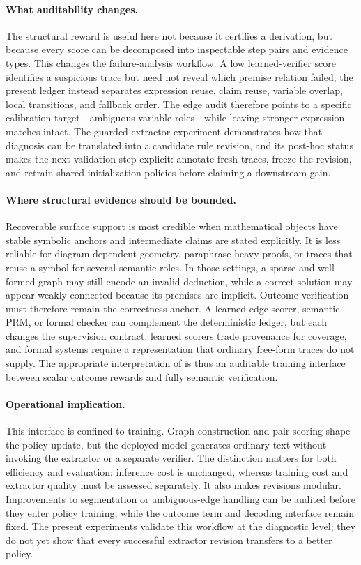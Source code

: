 \paragraph{What auditability changes.}
The structural reward is useful here not because it certifies a derivation, but because every score can be decomposed into inspectable step pairs and evidence types. This changes the failure-analysis workflow. A low learned-verifier score identifies a suspicious trace but need not reveal which premise relation failed; the present ledger instead separates expression reuse, claim reuse, variable overlap, local transitions, and fallback order. The edge audit therefore points to a specific calibration target---ambiguous variable roles---while leaving stronger expression matches intact. The guarded extractor experiment demonstrates how that diagnosis can be translated into a candidate rule revision, and its post-hoc status makes the next validation step explicit: annotate fresh traces, freeze the revision, and retrain shared-initialization policies before claiming a downstream gain.

\paragraph{Where structural evidence should be bounded.}
Recoverable surface support is most credible when mathematical objects have stable symbolic anchors and intermediate claims are stated explicitly. It is less reliable for diagram-dependent geometry, paraphrase-heavy proofs, or traces that reuse a symbol for several semantic roles. In those settings, a sparse and well-formed graph may still encode an invalid deduction, while a correct solution may appear weakly connected because its premises are implicit. Outcome verification must therefore remain the correctness anchor. A learned edge scorer, semantic PRM, or formal checker can complement the deterministic ledger, but each changes the supervision contract: learned scorers trade provenance for coverage, and formal systems require a representation that ordinary free-form traces do not supply. The appropriate interpretation of \method is thus an auditable training interface between scalar outcome rewards and fully semantic verification.

\paragraph{Operational implication.}
This interface is confined to training. Graph construction and pair scoring shape the policy update, but the deployed model generates ordinary text without invoking the extractor or a separate verifier. The distinction matters for both efficiency and evaluation: inference cost is unchanged, whereas training cost and extractor quality must be assessed separately. It also makes revisions modular. Improvements to segmentation or ambiguous-edge handling can be audited before they enter policy training, while the outcome term and decoding interface remain fixed. The present experiments validate this workflow at the diagnostic level; they do not yet show that every successful extractor revision transfers to a better policy.

